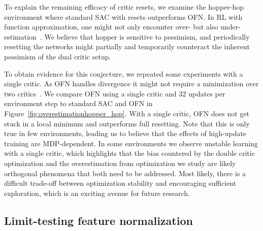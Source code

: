 To explain the remaining efficacy of critic resets, we examine the hopper-hop environment where standard SAC with resets outperforms OFN. 
In RL with function approximation, one might not only encounter over- but also under-estimation~\parencite{wu2020reducing, lan2020maxmin, saglam2021estimation}.
We believe that hopper  is sensitive to pessimism, and periodically resetting the networks might partially and temporarily counteract the inherent pessimism of the dual critic setup.

To obtain evidence for this conjecture, we repeated some experiments with a single critic. As OFN handles divergence it might not require a minimization over two critics~\parencite{fujimoto2018addressing}. We compare OFN using a single critic and $32$ updates per environment step to standard SAC and OFN in Figure~\ref{fig:overestimationhopper_hop}. With a single critic, OFN does not get stuck in a local minimum and outperforms full resetting. Note that this is only true in few environments, leading us to believe that the effects of high-update training are MDP-dependent.
In some environments we observe unstable learning with a single critic, which highlights that the bias countered by the double critic optimization and the overestimation from optimization we study are likely orthogonal phenomena that both need to be addressed.
Most likely, there is a difficult trade-off between optimization stability and encouraging sufficient exploration, which is an exciting avenue for future research.

\subsection{Limit-testing feature normalization}

